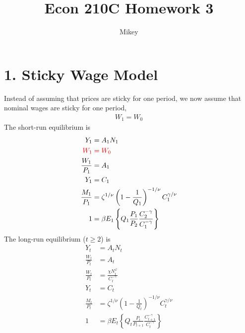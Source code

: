 \documentclass[answers]{exam}
\newcommand{\1}{\mathbf{1}}
\begin{document}
\title{Econ 210C Homework 3}
\author{Mikey}

\maketitle

\section*{1. Sticky Wage Model}
Instead of assuming that prices are sticky for one period, we now assume that nominal wages are sticky for one period,
\begin{align*}
	W_1 = W_0
\end{align*}
The short-run equilibrium is
\begin{align*}
	Y_1&=A_1N_{1}  \\
	\color{red}W_1&\color{red}= W_0  \\
	\frac{W_1}{P_1}&=A_1 \\
	Y_1&=C_1 \\
	\frac{M_1}{P_1}&=\zeta^{1/\nu}\left(1-\frac{1}{Q_1}\right)^{-1/\nu}C_{1}^{\gamma/\nu}\\
	1&=\beta E_1\left\{Q_1 \frac{P_1}{P_{2}} \frac{C_{2}^{-\gamma}}{C_{1}^{-\gamma}}\right\} 
\end{align*}
The long-run equilibrium ($t\ge 2$) is
\begin{align*}
	Y_t&=A_tN_{t}  \\
	\frac{W_t}{P_t}&= A_t  \\
	\frac{W_t}{P_t}&=\frac{\chi N_t^\varphi}{C_t^{-\gamma}} \\
	Y_t&=C_t \\
	\frac{M_t}{P_t}&=\zeta^{1/\nu}\left(1-\frac{1}{Q_t}\right)^{-1/\nu}C_{t}^{\gamma/\nu}\\
	1&=\beta E_t\left\{Q_t \frac{P_t}{P_{t+1}} \frac{C_{t+1}^{-\gamma}}{C_{t}^{-\gamma}}\right\} 
\end{align*}
\end{document}
